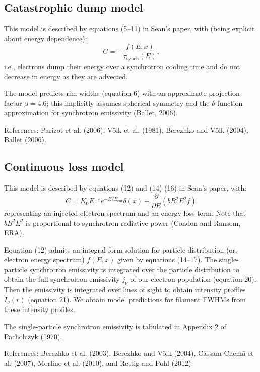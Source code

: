 \documentclass[10pt]{article}
\newcommand{\mt}{\mathrm}
\newcommand{\ptl}{\partial} %
\begin{document}
\subsection{Catastrophic dump model}

This model is described by equations (5--11) in Sean's paper, with (being
explicit about energy dependence):
\[
  C = -\frac{f(E,x)}{\tau_{\mt{synch}}(E)}\text{,}
\]
i.e., electrons dump their energy over a synchrotron cooling time and do not
decrease in energy as they are advected.

The model predicts rim widths (equation 6) with an approximate projection
factor $\beta = 4.6$; this implicitly assumes spherical symmetry and the
$\delta$-function approximation for synchrotron emissivity (Ballet, 2006).

References: Parizot et al. (2006), V\"{o}lk et al. (1981), Berezhko and
V\"{o}lk (2004), Ballet (2006).

\subsection{Continuous loss model}

This model is described by equations (12) and (14)-(16) in Sean's paper, with:
\[
  C = K_0 E^{-s} e^{-E/E_{\mt{cut}}} \delta(x) + \frac{\ptl}{\ptl E}
      \left(bB^2E^2f\right)
\]
representing an injected electron spectrum and an energy loss term.  Note that
$b B^2 E^2$ is proportional to synchrotron radiative power (Condon and Ransom,
\href{http://www.cv.nrao.edu/course/astr534/SynchrotronPower.html}{ERA}).

Equation (12) admits an integral form solution for particle distribution
(or, electron energy spectrum) $f(E,x)$ given by equations (14--17).
The single-particle synchrotron emissivity is integrated over the particle
distribution to obtain the full synchrotron emissivity $j_\nu$ of
our electron population (equation 20).  Then the emissivity is integrated over
lines of sight to obtain intensity profiles $I_\nu(r)$ (equation 21).
We obtain model predictions for filament FWHMs from these intensity profiles.

The single-particle synchrotron emissivity is tabulated in Appendix 2 of
Pacholczyk (1970).

References: Berezhko et al. (2003), Berezhko and V\"{o}lk (2004),
Cassam-Chena\"{i} et al. (2007), Morlino et al. (2010), and Rettig and Pohl
(2012).
\end{document}
